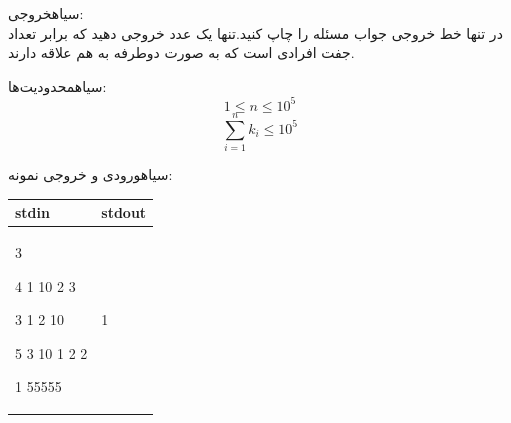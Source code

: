 ‌سیاه{خروجی:}\\
در تنها خط خروجی جواب مسئله را چاپ کنید.تنها یک عدد خروجی دهید که برابر تعداد جفت افرادی است که به صورت دوطرفه به هم علاقه دارند.

‌سیاه{محدودیت‌ها:}\\

$$1 \le n \le 10^5$$
$$\sum_{i=1}^{n} k_i \le 10^5$$


‌سیاه{ورودی و خروجی نمونه:}\\


\begin{latin}
	\begin{tabularx}{\textwidth}{|X | X|}
		\hline
		\textbf{stdin} &
		\textbf{stdout}\\
		\hline
		3
		
		4 1 10 2 3
		
		3 1 2 10
		
		5 3 10 1 2 2
		
		1 55555&
		1\\
		\hline
		
	\end{tabularx}
\end{latin}











